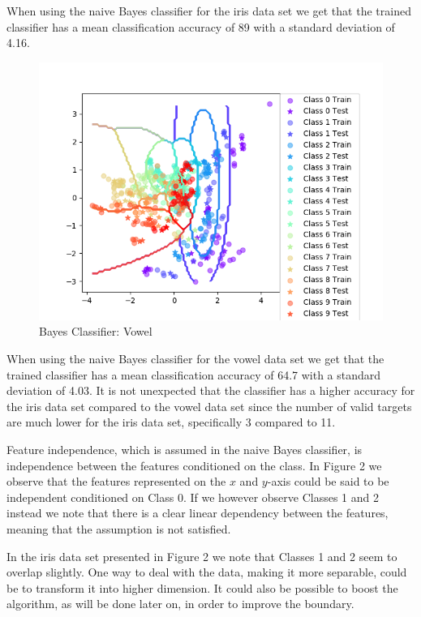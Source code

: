 \documentclass{article}
\begin{document}
When using the naive Bayes classifier for the iris data set we get that the trained classifier has a mean classification accuracy of 89 with a standard deviation of 4.16.

\begin{figure}
    \centering
    \includegraphics[scale = 0.90]{BayesVowel.png}
    \caption{Bayes Classifier: Vowel}
\end{figure}

When using the naive Bayes classifier for the vowel data set we get that the trained classifier has a mean classification accuracy of 64.7 with a standard deviation of 4.03. It is not unexpected that the classifier has a higher accuracy for the iris data set compared to the vowel data set since the number of valid targets are much lower for the iris data set, specifically 3 compared to 11.

Feature independence, which is assumed in the naive Bayes classifier, is independence between the features conditioned on the class. In Figure 2 we observe that the features represented on the $x$ and $y$-axis could be said to be independent conditioned on Class 0. If we however observe Classes 1 and 2 instead we note that there is a clear linear dependency between the features, meaning that the assumption is not satisfied. 

In the iris data set presented in Figure 2 we note that Classes 1 and 2 seem to overlap slightly. One way to deal with the data, making it more separable, could be to transform it into higher dimension. It could also be possible to boost the algorithm, as will be done later on, in order to improve the boundary. 
\end{document}
